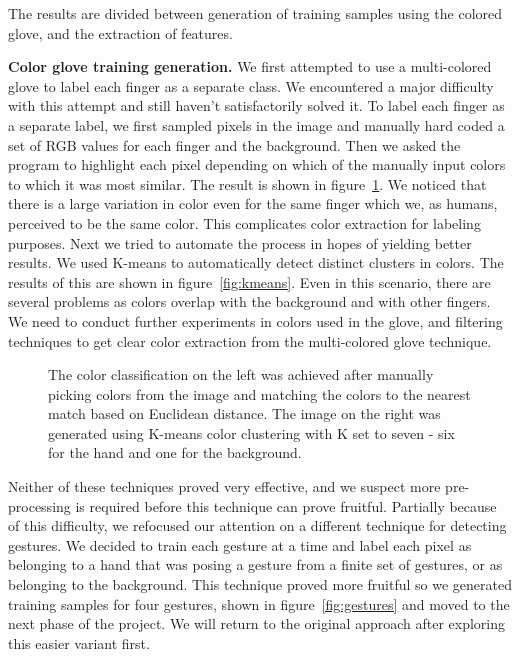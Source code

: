 \documentclass[11pt]{article}
\newcommand{\includeimage}[2] {\fbox{ \texttt{[image: \#2]}}}
\begin{document}
The results are divided between generation of training samples using the colored glove, and the extraction of features.

\textbf{Color glove training generation.} We first attempted to use a multi-colored glove to label each finger as a separate class. We encountered a major difficulty with this attempt and still haven't satisfactorily solved it. To label each finger as a separate label, we first sampled pixels in the image and manually hard coded a set of RGB values for each finger and the background. Then we asked the program to highlight each pixel depending on which of the manually input colors to which it was most similar. The result is shown in figure~\ref{fig:manualcolor}. We noticed that there is a large variation in color even for the same finger which we, as humans, perceived to be the same color. This complicates color extraction for labeling purposes. Next we tried to automate the process in hopes of yielding better results. We used K-means to automatically detect distinct clusters in colors. The results of this are shown in figure~\ref{fig:kmeans}. Even in this scenario, there are several problems as colors overlap with the background and with other fingers. We need to conduct further experiments in colors used in the glove, and filtering techniques to get clear color extraction from the multi-colored glove technique.

\begin{figure}
\begin{center}
\includeimage{50mm}{figures/manualcolor.png}
\includeimage{50mm}{figures/kmeans.png}
\end{center}
\caption{The color classification on the left was achieved after manually picking colors from the image and matching the colors to the nearest match based on Euclidean distance. The image on the right was generated using K-means color clustering with K set to seven - six for the hand and one for the background.}
\label{fig:kmeans}
\label{fig:manualcolor}
\end{figure}

Neither of these techniques proved very effective, and we suspect more pre-processing is required before this technique can prove fruitful. Partially because of this difficulty, we refocused our attention on a different technique for detecting gestures. We decided to train each gesture at a time and label each pixel as belonging to a hand that was posing a gesture from a finite set of gestures, or as belonging to the background. This technique proved more fruitful so we generated training samples for four gestures, shown in figure~\ref{fig:gestures} and moved to the next phase of the project. We will return to the original approach after exploring this easier variant first.
\end{document}
